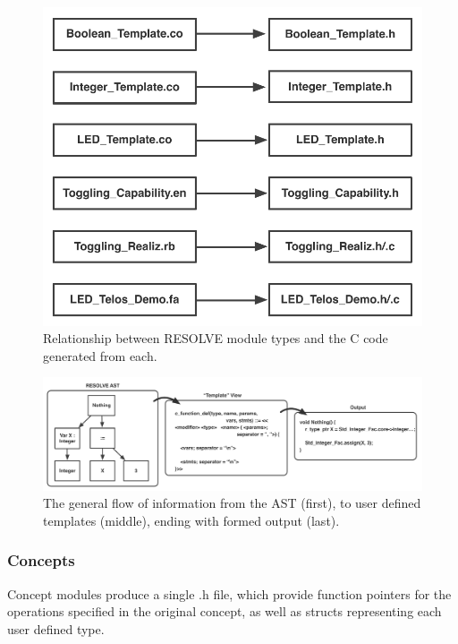 \begin{figure}
\begin{center}
\includegraphics[scale=.55]{figs/relationship.pdf}
\end{center}
\caption{Relationship between RESOLVE module types and the C code generated from each.}
\label{fig:relationship}
\end{figure}

\begin{figure}[!htb]
\begin{center}
\includegraphics[scale=.54]{figs/ast_traversal2.pdf}
\end{center}
\caption{The general flow of information from the AST (first), to user defined templates (middle), ending with formed output (last).}
\label{fig:ast}
\end{figure}

\subsubsection{Concepts}
\label{sec:conceptoverview}
Concept modules produce a single .h file, which provide function pointers for the operations specified in the original concept, as well as structs representing each user defined type. 

